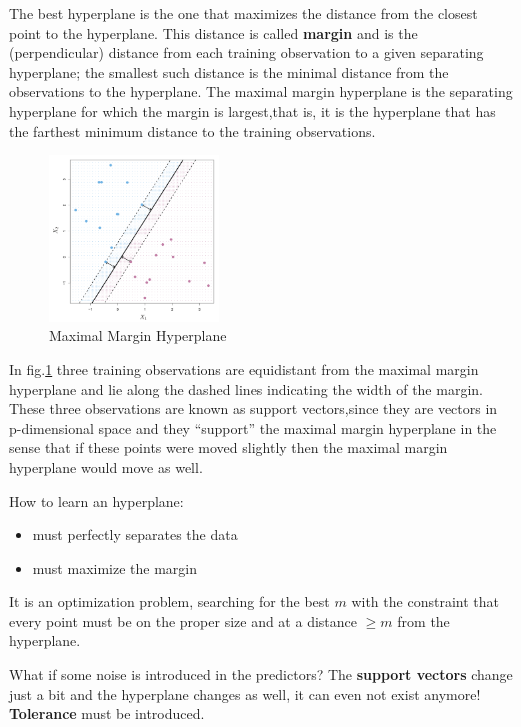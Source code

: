 \begin{definitionblock}
    The best hyperplane is the one that maximizes the distance from the closest point to the hyperplane. This distance is called \textbf{margin} and is the (perpendicular) distance from each training observation to a given separating hyperplane; the smallest such distance is the minimal distance from the observations to the hyperplane.
    The maximal margin hyperplane is the separating hyperplane for which the margin is largest,that is, it is the hyperplane that has the farthest minimum distance to the training observations.
\end{definitionblock}

\begin{figure}[H]
    \centering
    \includegraphics[width=0.4\textwidth]{assets/fig28.png}
    \caption{Maximal Margin Hyperplane}
    \label{fig:hyperplane2}
\end{figure}

In fig.\ref{fig:hyperplane2} three training observations are equidistant from the maximal margin hyperplane and lie along the dashed lines indicating the width of the margin. These three observations are known as support vectors,since they are vectors in p-dimensional space and they “support” the maximal margin hyperplane in the sense that if these points were moved slightly then the maximal margin hyperplane would move as well.

How to learn an hyperplane:
\begin{itemize}
    \item must perfectly separates the data
    \item must maximize the margin
\end{itemize}

It is an optimization problem, searching for the best $m$ with the constraint that every point must be on the proper size and at a distance $\geq m$ from the hyperplane.

\begin{warningblock}[Applicability]
    What if some noise is introduced in the predictors? The \textbf{support vectors} change just a bit and the hyperplane changes as well, it can even not exist anymore! \textbf{Tolerance} must be introduced.
\end{warningblock}

